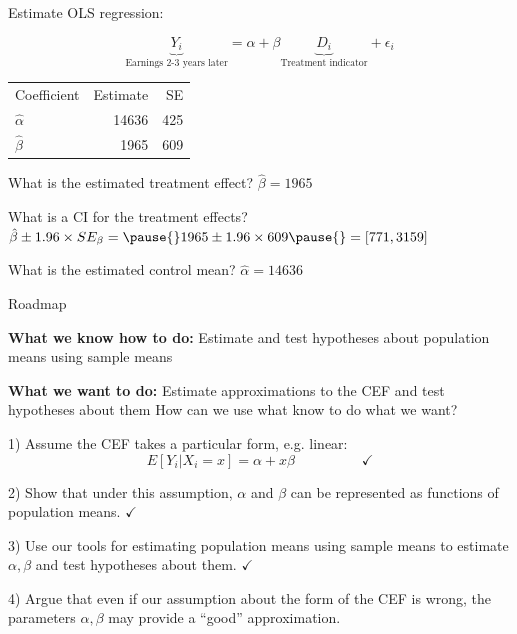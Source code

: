 \documentclass[11pt,english,handout]{beamer}
\newenvironment{wideitemize}{\itemize\addtolength{\itemsep}{10pt}}{\enditemize}
\begin{document}
\begin{frame}
\begin{wideitemize}
	\item
	Estimate OLS regression:
	
	$$ \underbrace{Y_i}_{\text{Earnings 2-3 years later}} = \alpha + \beta \underbrace{D_i}_{\text{Treatment indicator}} + \epsilon_i $$
	
	\pause
	\item
	
	\begin{tabular}{lrr}
	Coefficient & Estimate & SE \\
	$\hat\alpha$ & 14636 & 425 \\
	$\hat\beta$ & 1965 & 609
	\end{tabular}
	
	\pause
	\item
	What is the estimated treatment effect? \pause $\hat\beta = 1965$
	
	\item
	What is a CI for the treatment effects? \pause $\hat\beta \pm 1.96 \times SE_{\beta} = \pause{} 1965 \pm 1.96 \times 609 \pause{}  =  [771,3159]$
	
	
	\item
	What is the estimated control mean? \pause $\hat\alpha = 14636$
	
\end{wideitemize}	
	
\end{frame}



\begin{frame}{Roadmap}
	\begin{wideitemize}
		\item \textbf{What we know how to do:} Estimate and test hypotheses about population means using sample means
		\item \textbf{What we want to do:} Estimate approximations to the CEF and test hypotheses about them 
	\end{wideitemize}
	\bigskip
	How can we use what know to do what we want? 
	
	\begin{wideitemize}
		\item 1) Assume the CEF takes a particular form, e.g. linear:
		$$E[Y_i | X_i = x] = \alpha + x \beta \hspace{2cm }\checkmark$$
		
		\item 2) Show that under this assumption, $\alpha$ and $\beta$ can be represented as functions of population means. $\checkmark$
		
		\item
		3) Use our tools for estimating population means using sample means to estimate $\alpha,\beta$ and test hypotheses about them. $\checkmark$
		
		\item
		4) Argue that even if our assumption about the form of the CEF is wrong, the parameters $\alpha,\beta$ may provide a ``good'' approximation.
	\end{wideitemize}
	
\end{frame}
\end{document}
